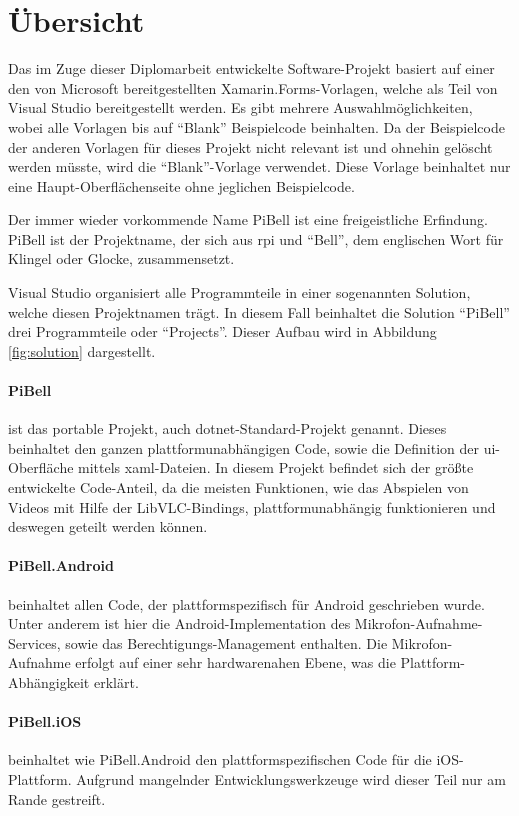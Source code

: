 \label{ch:prog-doc}
\section{Übersicht}
Das im Zuge dieser Diplomarbeit entwickelte Software-Projekt basiert auf einer den von Microsoft bereitgestellten Xamarin.Forms-Vorlagen, welche als Teil von Visual Studio bereitgestellt werden.
Es gibt mehrere Auswahlmöglichkeiten, wobei alle Vorlagen bis auf \enquote{Blank} Beispielcode beinhalten.
Da der Beispielcode der anderen Vorlagen für dieses Projekt nicht relevant ist und ohnehin gelöscht werden müsste, wird die \enquote{Blank}-Vorlage verwendet.
Diese Vorlage beinhaltet nur eine Haupt-Oberflächenseite ohne jeglichen Beispielcode.

Der immer wieder vorkommende Name PiBell ist eine freigeistliche Erfindung. PiBell ist der Projektname, der sich aus \acl{rpi} und \enquote{Bell}, dem englischen Wort für Klingel oder Glocke, zusammensetzt.

Visual Studio organisiert alle Programmteile in einer sogenannten Solution, welche diesen Projektnamen trägt. In diesem Fall beinhaltet die Solution \enquote{PiBell} drei Programmteile oder \enquote{Projects}.
Dieser Aufbau wird in Abbildung \ref{fig:solution} dargestellt.

\paragraph{PiBell} ist das portable Projekt, auch \ac{dotnet}-Standard-Projekt genannt.
Dieses beinhaltet den ganzen plattformunabhängigen Code, sowie die Definition der \ac{ui}-Oberfläche mittels \ac{xaml}-Dateien.
In diesem Projekt befindet sich der größte entwickelte Code-Anteil, da die meisten Funktionen, wie das Abspielen von Videos mit Hilfe der LibVLC-Bindings, plattformunabhängig funktionieren und deswegen geteilt werden können.

\paragraph{PiBell.Android} beinhaltet allen Code, der plattformspezifisch für Android geschrieben wurde.
Unter anderem ist hier die Android-Implementation des Mikrofon-Auf\-nahme-Services, sowie das Berechtigungs-Management enthalten.
Die Mikrofon-Aufnahme erfolgt auf einer sehr hardwarenahen Ebene, was die Plattform-Abhängigkeit erklärt.

\paragraph{PiBell.iOS} beinhaltet wie PiBell.Android den plattformspezifischen Code für die iOS-Platt\-form. Aufgrund mangelnder Entwicklungswerkzeuge wird dieser Teil nur am Rande gestreift.\par

